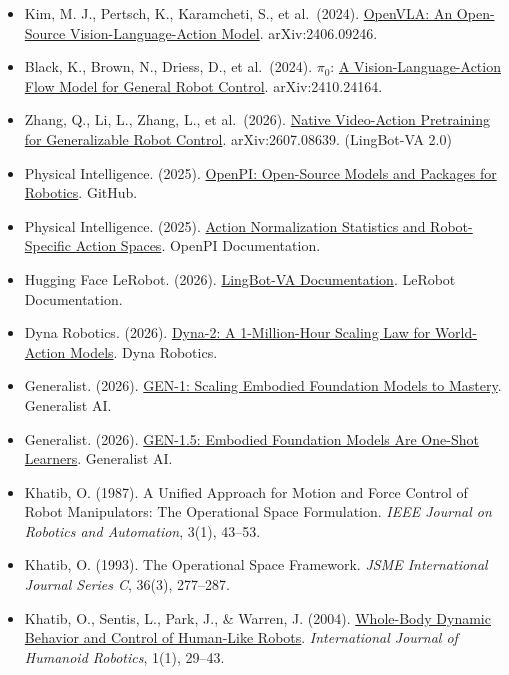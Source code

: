 \vspace{0.25em}
\begin{itemize}
\tightlist
\item
  Kim, M. J., Pertsch, K., Karamcheti, S., et al.~(2024). \href{https://arxiv.org/abs/2406.09246}{OpenVLA: An Open-Source Vision-Language-Action Model}. arXiv:2406.09246.
\item
  Black, K., Brown, N., Driess, D., et al.~(2024). \(\pi_0\): \href{https://arxiv.org/abs/2410.24164}{A Vision-Language-Action Flow Model for General Robot Control}. arXiv:2410.24164.
\item
  Zhang, Q., Li, L., Zhang, L., et al.~(2026). \href{https://arxiv.org/abs/2607.08639}{Native Video-Action Pretraining for Generalizable Robot Control}. arXiv:2607.08639. (LingBot-VA 2.0)
\item
  Physical Intelligence. (2025). \href{https://github.com/Physical-Intelligence/openpi}{OpenPI: Open-Source Models and Packages for Robotics}. GitHub.
\item
  Physical Intelligence. (2025). \href{https://github.com/Physical-Intelligence/openpi/blob/main/docs/norm_stats.md}{Action Normalization Statistics and Robot-Specific Action Spaces}. OpenPI Documentation.
\item
  Hugging Face LeRobot. (2026). \href{https://huggingface.co/docs/lerobot/main/lingbot_va}{LingBot-VA Documentation}. LeRobot Documentation.
\item
  Dyna Robotics. (2026). \href{https://www.dyna.co/dyna-2}{Dyna-2: A 1-Million-Hour Scaling Law for World-Action Models}. Dyna Robotics.
\item
  Generalist. (2026). \href{https://generalistai.com/blog/gen-1}{GEN-1: Scaling Embodied Foundation Models to Mastery}. Generalist AI.
\item
  Generalist. (2026). \href{https://generalistai.com/blog/gen-1.5}{GEN-1.5: Embodied Foundation Models Are One-Shot Learners}. Generalist AI.
\item
  Khatib, O. (1987). A Unified Approach for Motion and Force Control of Robot Manipulators: The Operational Space Formulation. \emph{IEEE Journal on Robotics and Automation}, 3(1), 43--53.
\item
  Khatib, O. (1993). The Operational Space Framework. \emph{JSME International Journal Series C}, 36(3), 277--287.
\item
  Khatib, O., Sentis, L., Park, J., \& Warren, J. (2004). \href{https://khatib.stanford.edu/publications/pdfs/Khatib_2004_IJHR.pdf}{Whole-Body Dynamic Behavior and Control of Human-Like Robots}. \emph{International Journal of Humanoid Robotics}, 1(1), 29--43.

\end{itemize}
